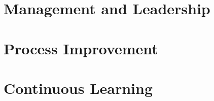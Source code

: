 \documentclass{article}
\begin{document}
	\section{Management and Leadership}


	\section{Process Improvement}


	\section{Continuous Learning}



\newpage


\nocite{*}

\end{document}
